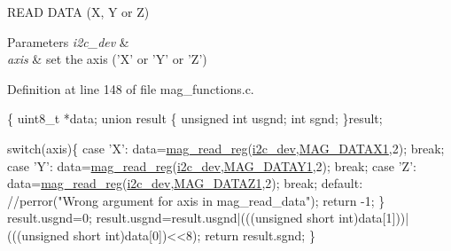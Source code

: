 R\-E\-A\-D D\-A\-T\-A (X, Y or Z) 


\begin{DoxyParams}{Parameters}
{\em i2c\-\_\-dev} & \\
\hline
{\em axis} & set the axis ('X' or 'Y' or 'Z') \\
\hline
\end{DoxyParams}


Definition at line 148 of file mag\-\_\-functions.\-c.


\begin{DoxyCode}
\{
  uint8\_t *data;
  \textcolor{keyword}{union }result
  \{
    \textcolor{keywordtype}{unsigned} \textcolor{keywordtype}{int} usgnd;
    \textcolor{keywordtype}{int} sgnd;
  \}result;

  \textcolor{keywordflow}{switch}(axis)\{
    \textcolor{keywordflow}{case} \textcolor{charliteral}{'X'}:
      data=\hyperlink{group__mag_ga6830eaeae2298320e1e8c902e4edd709}{mag\_read\_reg}(\hyperlink{CommunicationV0_2communication_8c_a7751bd45ac1064efb35adf1f19c25db8}{i2c\_dev},\hyperlink{communication_2imu__regs_8h_a4f883328e7ae117996e334145ddd0032}{MAG\_DATAX1},2);
      \textcolor{keywordflow}{break};
    \textcolor{keywordflow}{case} \textcolor{charliteral}{'Y'}:
      data=\hyperlink{group__mag_ga6830eaeae2298320e1e8c902e4edd709}{mag\_read\_reg}(\hyperlink{CommunicationV0_2communication_8c_a7751bd45ac1064efb35adf1f19c25db8}{i2c\_dev},\hyperlink{communication_2imu__regs_8h_ae218906702b1e40c2b6970f97dd0cfe4}{MAG\_DATAY1},2);
      \textcolor{keywordflow}{break};
    \textcolor{keywordflow}{case} \textcolor{charliteral}{'Z'}:
      data=\hyperlink{group__mag_ga6830eaeae2298320e1e8c902e4edd709}{mag\_read\_reg}(\hyperlink{CommunicationV0_2communication_8c_a7751bd45ac1064efb35adf1f19c25db8}{i2c\_dev},\hyperlink{communication_2imu__regs_8h_a81d7d9236ec69a1a229e4fa7c6299fde}{MAG\_DATAZ1},2);
      \textcolor{keywordflow}{break};
    \textcolor{keywordflow}{default}:
      \textcolor{comment}{//perror("Wrong argument for axis in mag\_read\_data");}
      \textcolor{keywordflow}{return} -1;
  \}
  result.usgnd=0;
  result.usgnd=result.usgnd|(((\textcolor{keywordtype}{unsigned} \textcolor{keywordtype}{short} int)data[1]))|(((\textcolor{keywordtype}{unsigned} \textcolor{keywordtype}{short} \textcolor{keywordtype}{
      int})data[0])<<8);
  \textcolor{keywordflow}{return} result.sgnd;
\}
\end{DoxyCode}
